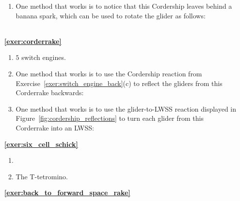 \begin{multicols}{2}
\begin{itemize}[leftmargin=0em]
\begin{enumerate}[leftmargin=1.5em,label=\bf\color{ocre}(\alph*)]
			\item One method that works is to notice that this Cordership leaves behind a banana spark, which can be used to rotate the glider as follows: \\[-0.6em]
			
			 \\
		\end{enumerate}
		
		
	\item[\bf\color{ocre}\sffamily\ref{exer:corderrake}]
		\begin{enumerate}[leftmargin=1.5em,label=\bf\color{ocre}(\alph*)]
			\item $5$ switch engines.
			
			\item One method that works is to use the Cordership reaction from Exercise~\ref{exer:switch_engine_back}(c) to reflect the gliders from this Corderrake backwards: \\[-0.6em]
			
			
			\item One method that works is to use the glider-to-LWSS reaction displayed in Figure~\ref{fig:cordership_reflections} to turn each glider from this Corderrake into an LWSS: \\[-0.6em]
			
		\end{enumerate}
		
		
	\item[\bf\color{ocre}\sffamily\ref{exer:six_cell_schick}]
		\begin{enumerate}[leftmargin=1.5em,label=\bf\color{ocre}(\alph*)]
			\item {} \\
			
			\item The T-tetromino. \\
		\end{enumerate}
		
		
	\item[\bf\color{ocre}\sffamily\ref{exer:back_to_forward_space_rake}]  \\
	

\end{itemize}
\end{multicols}
